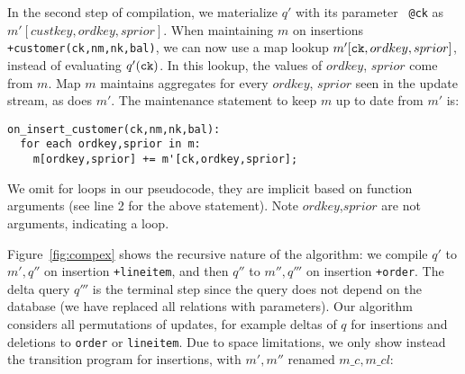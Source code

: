 In the second step of compilation, we materialize $q'$ with its parameter {\tt
@ck} as $m'[custkey,ordkey,sprior]$. When maintaining $m$ on insertions {\tt
+customer(ck,nm,nk,bal)}, we can now use a map lookup $m'[\mbox{{\tt
ck}},ordkey,sprior]$, instead of evaluating $q'(\mbox{{\tt ck}})$. In this
lookup, the values of $ordkey$, $sprior$ come from $m$. Map $m$ maintains
aggregates for every $ordkey$, $sprior$ seen in the update stream, as does $m'$.
The maintenance statement to keep $m$ up to date from $m'$ is:

{\footnotesize
\begin{verbatim}
on_insert_customer(ck,nm,nk,bal):
  for each ordkey,sprior in m:
    m[ordkey,sprior] += m'[ck,ordkey,sprior];
\end{verbatim}
}

\noindent We omit for loops in our pseudocode, they are implicit based on
function arguments (see line 2 for the above statement). Note $ordkey$,$sprior$
are not arguments, indicating a loop.

Figure~\ref{fig:compex} shows the recursive nature of the algorithm: we compile
$q'$ to $m',q''$ on insertion {\tt +lineitem}, and then $q''$ to $m'',q'''$ on
insertion {\tt +order}. The delta query $q'''$ is the terminal step since the
query does not depend on the database (we have replaced all relations with
parameters). Our algorithm considers all permutations of updates, for example
deltas of $q$ for insertions and deletions to {\tt order} or {\tt lineitem}. Due
to space limitations, we only show instead the transition program for
insertions, with $m',m''$ renamed $m\_c,m\_cl$:


